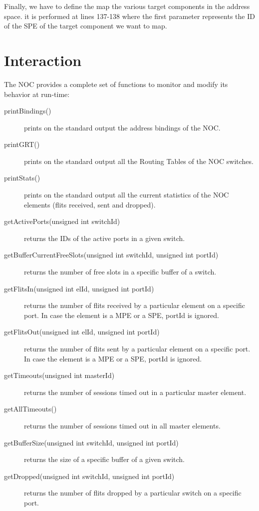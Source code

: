 \documentclass[a4paper,11pt,oneside]{article}
\begin{document}

Finally, we have to define the map the various target components in the address space. it is performed at lines 137-138 where the first parameter represents the ID of the SPE of the target component we want to map.

\section{Interaction}
\label{inter}
The NOC provides a complete set of functions to monitor and modify its behavior at run-time:
\begin{description}
\item[printBindings()] prints on the standard output the address bindings of the NOC.
\item[printGRT()] prints on the standard output all the Routing Tables of the NOC switches.
\item[printStats()] prints on the standard output all the current statistics of the NOC elements (flits received, sent and dropped).
\item[getActivePorts(unsigned int switchId)] returns the IDs of the active ports in a given switch.  
\item[getBufferCurrentFreeSlots(unsigned int switchId, unsigned int portId)] returns the number of free slots in a specific buffer of a switch.
\item[getFlitsIn(unsigned int elId, unsigned int portId)] returns the number of flits received by a particular element on a specific port. In case the element is a MPE or a SPE, portId is ignored.
\item[getFlitsOut(unsigned int elId, unsigned int portId)] returns the number of flits sent by a particular element on a specific port. In case the element is a MPE or a SPE, portId is ignored.
\item[getTimeouts(unsigned int masterId)] returns the number of sessions timed out in a particular master element.
\item[getAllTimeouts()] returns the number of sessions timed out in all master elements.
\item[getBufferSize(unsigned int switchId, unsigned int portId)] returns the size of a specific buffer of a given switch.
\item[getDropped(unsigned int switchId, unsigned int portId)] returns the number of flits dropped by a particular switch on a specific port.

\end{description}
\end{document}
